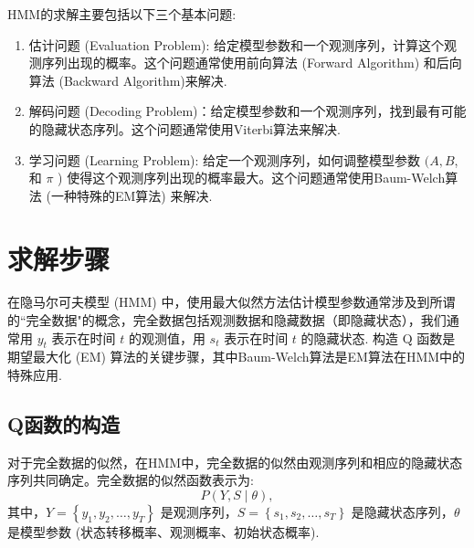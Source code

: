 \documentclass[UTF8,12pt]{ctexart}
\numberwithin{equation}{section}%
\begin{document}
	
	\begin{boxF}
		HMM的求解主要包括以下三个基本问题:
		\begin{enumerate}
			\item 估计问题 (Evaluation Problem): 给定模型参数和一个观测序列，计算这个观测序列出现的概率。这个问题通常使用前向算法 (Forward Algorithm) 和后向算法 (Backward Algorithm)来解决.
			\item 解码问题 (Decoding Problem)：给定模型参数和一个观测序列，找到最有可能的隐藏状态序列。这个问题通常使用Viterbi算法来解决.
			\item 学习问题 (Learning Problem): 给定一个观测序列，如何调整模型参数 $(A, B$, 和 $\pi$ ) 使得这个观测序列出现的概率最大。这个问题通常使用Baum-Welch算法 (一种特殊的EM算法) 来解决.
		\end{enumerate}
	\end{boxF}
	
	\section{求解步骤}
	在隐马尔可夫模型 (HMM) 中，使用最大似然方法估计模型参数通常涉及到所谓的“完全数据"的概念，完全数据包括观测数据和隐藏数据（即隐藏状态），我们通常用 $y_t$ 表示在时间 $t$ 的观测值，用 $s_t$ 表示在时间 $t$ 的隐藏状态. 构造 $\mathrm{Q}$ 函数是期望最大化 (EM) 算法的关键步骤，其中Baum-Welch算法是EM算法在HMM中的特殊应用.
	
	\subsection{Q函数的构造}
	
	对于完全数据的似然，在HMM中，完全数据的似然由观测序列和相应的隐藏状态序列共同确定。完全数据的似然函数表示为:
	$$
	P(Y, S \mid \theta),
	$$
	其中，$Y=\left\{y_1, y_2, \ldots, y_T\right\}$ 是观测序列，$S=\left\{s_1, s_2, \ldots, s_T\right\}$ 是隐藏状态序列，$\theta$ 是模型参数 (状态转移概率、观测概率、初始状态概率).
	
\end{document}

